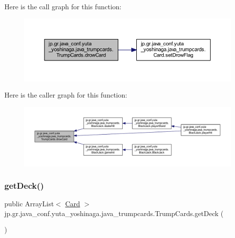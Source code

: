 Here is the call graph for this function\+:
\nopagebreak
\begin{figure}[H]
\begin{center}
\leavevmode
\includegraphics[width=350pt]{classjp_1_1gr_1_1java__conf_1_1yuta__yoshinaga_1_1java__trumpcards_1_1_trump_cards_a762812743e7d271596147b7dbcdd4ada_cgraph}
\end{center}
\end{figure}
Here is the caller graph for this function\+:
\nopagebreak
\begin{figure}[H]
\begin{center}
\leavevmode
\includegraphics[width=350pt]{classjp_1_1gr_1_1java__conf_1_1yuta__yoshinaga_1_1java__trumpcards_1_1_trump_cards_a762812743e7d271596147b7dbcdd4ada_icgraph}
\end{center}
\end{figure}
\mbox{\label{classjp_1_1gr_1_1java__conf_1_1yuta__yoshinaga_1_1java__trumpcards_1_1_trump_cards_a45f2e4f7204b7fed4689e9187791df23}} 
\subsubsection{\texorpdfstring{get\+Deck()}{getDeck()}}
{\footnotesize\ttfamily public Array\+List$<$ \hyperlink{classjp_1_1gr_1_1java__conf_1_1yuta__yoshinaga_1_1java__trumpcards_1_1_card}{Card} $>$ jp.\+gr.\+java\+\_\+conf.\+yuta\+\_\+yoshinaga.\+java\+\_\+trumpcards.\+Trump\+Cards.\+get\+Deck (\begin{DoxyParamCaption}{ }\end{DoxyParamCaption})}



